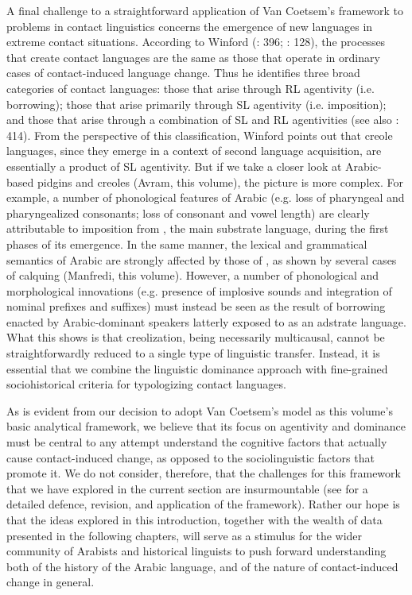 \documentclass[output=paper]{langsci/langscibook}
\begin{document}
A final challenge to a straightforward application of Van Coetsem's framework to problems in contact linguistics concerns the emergence of new languages in extreme contact situations. According to Winford (\citeyear{Winford2005}: 396; \citeyear{Winford2008}: 128), the processes that create contact languages are the same as those that operate in ordinary cases of contact-induced language change. Thus he identifies three broad categories of contact languages: those that arise through RL agentivity (i.e. borrowing); those that arise primarily through SL agentivity (i.e. imposition); and those that arise through a combination of SL and RL agentivities (see also \citealt{Manfredi2018}: 414). From the perspective of this classification, Winford points out that creole languages, since they emerge in a context of second language acquisition, are essentially a product of SL agentivity. But if we take a closer look at Arabic-based pidgins and creoles (Avram, this volume), the picture is more complex. For example, a number of phonological features of  Arabic (e.g. loss of pharyngeal and pharyngealized consonants; loss of consonant and vowel length) are clearly attributable to imposition from , the main substrate language, during the first phases of its emergence. In the same manner, the lexical and grammatical semantics of  Arabic are strongly affected by those of , as shown by several cases of calquing (Manfredi, this volume). However, a number of phonological and morphological innovations (e.g. presence of implosive sounds and integration of nominal prefixes and suffixes) must instead be seen as the result of borrowing enacted by  Arabic-dominant speakers latterly exposed to  as an adstrate language. What this shows is that creolization, being necessarily multicausal, cannot be straightforwardly reduced to a single type of linguistic transfer. Instead, it is essential that we combine the linguistic dominance approach with fine-grained sociohistorical criteria for typologizing contact languages.  

As is evident from our decision to adopt Van Coetsem's model as this volume's basic analytical framework, we believe that its focus on agentivity and dominance must be central to any attempt understand the cognitive factors that actually cause contact-induced change, as opposed to the sociolinguistic factors that promote it. We do not consider, therefore, that the challenges for this framework that we have explored in the current section are insurmountable (see \citealt{Lucas2012,Lucas2015} for a detailed defence, revision, and application of the framework). Rather our hope is that the ideas explored in this introduction, together with the wealth of data presented in the following chapters, will serve as a stimulus for the wider community of Arabists and historical linguists to push forward understanding both of the history of the Arabic language, and of the nature of contact-induced change in general.  
\end{document}
